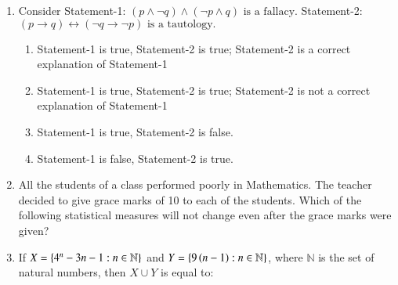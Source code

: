 \documentclass[journal,12pt,twocolumn]{IEEEtran}
\theoremstyle{remark}
\begin{document}
\begin{enumerate}
    \item Consider \newline
    Statement-1: $(p \land \neg q) \land (\neg p \land q) \text{ is a fallacy.}$\newline
    Statement-2: $(p \rightarrow q) \leftrightarrow (\neg q \rightarrow \neg p) \text{ is a tautology.}$
    
    \hfill{}
    \begin{enumerate}
        \item Statement-1 is true, Statement-2 is true; Statement-2 is a correct explanation of Statement-1
        \item Statement-1 is true, Statement-2 is true; Statement-2 is not a correct explanation of Statement-1
        \item Statement-1 is true, Statement-2 is false.
        \item Statement-1 is false, Statement-2 is true.
    \end{enumerate}
    
    \item All the students of a class performed poorly in Mathematics. The teacher decided to give grace marks of 10 to each of the students. Which of the following statistical measures will not change even after the grace marks were given?
    
    \hfill{}
    \begin{enumerate}
    \end{enumerate}
    
    \item If $X = \left\{4^n - 3n - 1 : n \in \mathbb{N}\right\}$ and $Y = \left\{9 \left(n - 1\right) : n \in \mathbb{N}\right\}$, where $\mathbb{N}$ is the set of natural numbers, then $X \cup Y$ is equal to:
    
    \hfill{}
    \begin{enumerate}
    \end{enumerate}
    

\end{enumerate}
\end{document}
